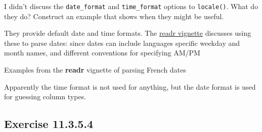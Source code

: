 \documentclass[]{book}
\newenvironment{Shaded}{\begin{snugshade}}{\end{snugshade}}
\newcommand{\CommentTok}[1]{\textcolor[rgb]{0.56,0.35,0.01}{\textit{#1}}}
\newcommand{\DataTypeTok}[1]{\textcolor[rgb]{0.13,0.29,0.53}{#1}}
\newcommand{\KeywordTok}[1]{\textcolor[rgb]{0.13,0.29,0.53}{\textbf{#1}}}
\newcommand{\NormalTok}[1]{#1}
\newcommand{\StringTok}[1]{\textcolor[rgb]{0.31,0.60,0.02}{#1}}
\theoremstyle{plain}
\theoremstyle{remark}
\begin{document}
I didn't discuss the \texttt{date\_format} and \texttt{time\_format}
options to \texttt{locale()}. What do they do? Construct an example that
shows when they might be useful.

They provide default date and time formats. The
\href{https://cran.r-project.org/web/packages/readr/vignettes/locales.html}{readr
vignette} discusses using these to parse dates: since dates can include
languages specific weekday and month names, and different conventions
for specifying AM/PM

\begin{Shaded}
\end{Shaded}

Examples from the \textbf{readr} vignette of parsing French dates

\begin{Shaded}
\end{Shaded}

Apparently the time format is not used for anything, but the date format
is used for guessing column types.

\hypertarget{exercise-11.3.5.4}{%
\subsection*{\texorpdfstring{Exercise
{11.3.5.4}}{Exercise 11.3.5.4}}\label{exercise-11.3.5.4}}
\end{document}

